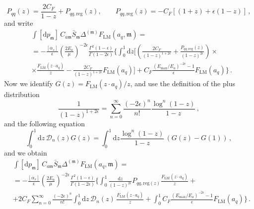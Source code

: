 \documentclass[a4paper, 12pt]{book}
\newcommand{\um}{\mathfrak{m}}
\begin{document}
\begin{equation}
  P_{qq}(z) = \frac{2 C_F}{1-z} + P_{qq,\mathrm{reg}} (z), \qquad P_{qq,\mathrm{reg}} (z) = - C_F [(1+z)+\epsilon(1-z)] \, ,
\end{equation}
and write
\begin{equation}
  \begin{split}
  & \int [\mathrm{d}p_\um] \, C_{a\um} \bar{S}_\um \Delta^{(\um)} F_{\mathrm{LM}} (a_q, \um) = \\
  & = -\frac{[\alpha_s]}{\epsilon}  \left(\frac{2E_a}{\mu}\right)^{-2\epsilon} \frac{\Gamma^2(1-\epsilon)}{\Gamma(1-2\epsilon)} \Biggl\{ \int_{0}^{1} \mathrm{d}z \Biggl[  \left( \frac{2C_F}{(1-z)^{1+2\epsilon}} + \frac{P_{qq, \mathrm{reg}}(z)}{(1-z)^{2\epsilon}} \right) \times \\
  & \times \frac{F_{\mathrm{LM}}(z\cdot a_q)}{z} - \frac{2 C_F}{(1-z)^{1+2\epsilon}} F_{\mathrm{LM}}(a_q) \Biggr] + C_F \frac{(E_{\mathrm{max}}/E_a)^{-2\epsilon}-1}{\epsilon} F_{\mathrm{LM}}(a_q)  \Biggr\} \,.
  \label{coll-pass-1}
  \end{split}
\end{equation}
Now we identify $G(z)=F_{\mathrm{LM}}(z \cdot a_q)/z$, and use the definition of the plus distribution
\begin{equation}
  \frac{1}{(1-z)^{1+2\epsilon}} = \sum_{n=0}^{\infty} \frac{(-2\epsilon)^n}{n!} \frac{\log^n{(1-z)}}{1-z} \,,
\end{equation}
and the following equation
\begin{equation}
  \int_0^1 \mathrm{d}z \, \mathcal{D}_n(z) G(z) = \int_0^1 \mathrm{d}z \frac{\log^n{(1-z)}}{1-z} \, \left(G(z)-G(1)\right) \, ,
\end{equation}
and we obtain 
\begin{equation}
  \begin{split}
  & \int [\mathrm{d}p_\um]\, C_{a\um} \bar{S}_\um \Delta^{(\um)} F_{\mathrm{LM}} (a_q, \um) = \\
  & = -\frac{[\alpha_s]}{\epsilon}  \left(\frac{2E_a}{\mu}\right)^{-2\epsilon} \frac{\Gamma^2(1-\epsilon)}{\Gamma(1-2\epsilon)} \Biggl\{ \int_0^1 \frac{\mathrm{d}z}{(1-z)^{2\epsilon}} P_{qq,\mathrm{reg}(z)} \frac{F_{\mathrm{LM}}(z\cdot a_q)}{z} + \\
  & + 2C_F \sum_{n=0}^{\infty} \frac{(-2\epsilon)^n}{n!} \int_0^1 \mathrm{d}z \, \mathcal{D}_n(z) \, \frac{F_{\mathrm{LM}}(z\cdot a_q)}{z} + \int_0^1 C_F \frac{(E_{\mathrm{max}}/E_a)^{-2\epsilon}-1}{\epsilon} F_{\mathrm{LM}}(a_q) \Biggr\} \, .  
  \label{coll-pass-2}
  \end{split}
\end{equation}
\end{document}
